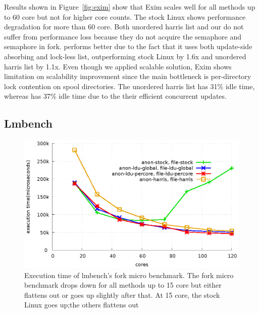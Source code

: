 Results shown in Figure~\ref{fig:exim} show that Exim scales well for all
methods up to 60 core but not for higher core counts.
The stock Linux shows performance degradation for more than 60 core.
Both unordered harris list
and our  do not suffer from performance loss 
because they do not acquire the 
semaphore and  semaphore in fork.
 performs better due to the fact that it uses both update-side
absorbing and lock-less list, outperforming stock Linux by 1.6x and unordered
harris list by 1.1x.
Even though we applied scalable solution, Exim shows limitation on scalability
improvement
since the main bottleneck is per-directory lock contention on spool
directories.
The unordered harris list has 31\% idle time, whereas  has 37\% idle
time due to the their efficient concurrent updates.



\subsection{Lmbench}


\begin{figure}[tb]
  \begin{center}
    \includegraphics[scale=0.65]{graph/lmbench.eps}
  \end{center}
  \caption{Execution time of lmbench's fork micro benchmark. The fork micro
  benchmark drops down for all methods up to 15 core but either flattens out or
  goes up slightly after that. At 15 core, the stock Linux goes up;the others
  flattens out}
  \label{fig:MicroBench}
\end{figure}

